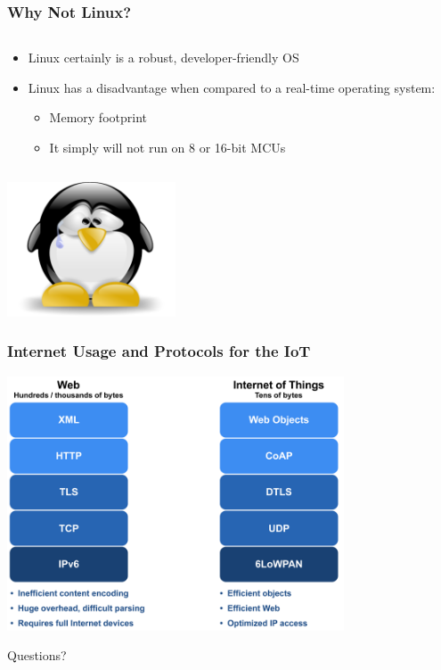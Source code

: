 \documentclass{beamer}
\begin{document}
\begin{frame}
	\frametitle{Why Not Linux?}
	\begin{columns}[c]
		\begin{column}{30cm}
			\vspace{.1cm}
			\begin{itemize}
				\justifying
				\item Linux certainly is a robust, developer-friendly OS
				\item Linux has a disadvantage when compared to a real-time operating system:
				\begin{itemize}
					\justifying
					\item Memory footprint
					\item It simply will not run on 8 or 16-bit MCUs
				\end{itemize}
			\end{itemize}
		\end{column}
	\end{columns}
	\vspace{.5cm}
	\hspace*{5.5cm} \includegraphics[width=5cm]{figs/tux-sad.png}
\end{frame}

\begin{frame}
	\frametitle{Internet Usage and Protocols for the IoT}
	\vspace{.5cm}
	\hspace*{1.5cm} \includegraphics[width=10cm]{figs/Web-and-IoT-Stacks.png}
\end{frame}

\begin{frame}
	\vspace{1cm}
	\begin{Huge}
		\begin{center}
			Questions?
		\end{center}
	\end{Huge}
\end{frame}
\end{document}
